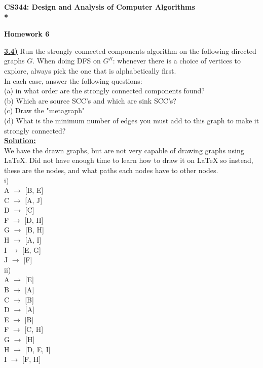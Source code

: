 \documentclass{article}
\begin{document}
\begin{center}
\bf{\LARGE CS344: Design and Analysis of Computer Algorithms} \\*

\vspace{0.2in}
{\bf {\Large Homework 6}}
\end{center}

\vspace{.2in}


\vspace{.2in}
\noindent \textbf{\underline{3.4)}} Run the strongly connected components algorithm on the following directed graphs $G$. When doing DFS on $G^R$: whenever there is a choice of vertices to explore, always pick the one that is alphabetically first. \\
\indent In each case, answer the following questions: \\
\indent (a) in what order are the strongly connected components found? \\
\indent (b) Which are source SCC's and which are sink SCC's? \\
\indent (c) Draw the "metagraph" \\
\indent (d) What is the minimum number of edges you must add to this graph to make it strongly connected? \\

\noindent \textbf{\underline{Solution:}}  \\

We have the drawn graphs, but are not very capable of drawing graphs using LaTeX. Did not have enough time to learn how to draw it on LaTeX so instead, these are the nodes, and what paths each nodes have to other nodes. \\
i) \\
\indent A $\rightarrow$ [B, E] \\
\indent C $\rightarrow$ [A, J]\\
\indent D $\rightarrow$ [C]\\
\indent F $\rightarrow$ [D, H]\\
\indent G $\rightarrow$ [B, H]\\
\indent H $\rightarrow$ [A, I]\\
\indent I $\rightarrow$ [E, G]\\
\indent J $\rightarrow$ [F]\\

\noindent ii) \\
\indent A $\rightarrow$ [E] \\
\indent B $\rightarrow$ [A] \\
\indent C $\rightarrow$ [B] \\
\indent D $\rightarrow$ [A] \\
\indent E $\rightarrow$ [B] \\
\indent F $\rightarrow$ [C, H] \\
\indent G $\rightarrow$ [H] \\
\indent H $\rightarrow$ [D, E, I] \\
\indent I $\rightarrow$ [F, H] \\
\end{document}
